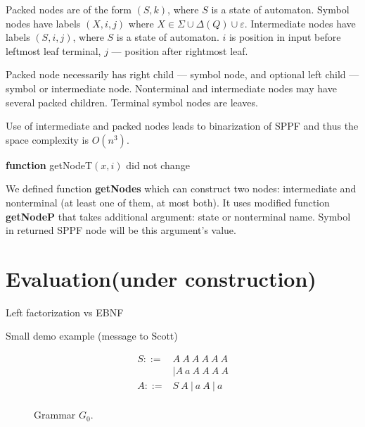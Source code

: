 \documentclass[runningheads,a4paper]{llncs}
\begin{document}
Packed nodes are of the form $(S, k)$, where $S$ is a state of automaton. 
Symbol nodes have labels $(X, i, j)$ where $X \in \Sigma \cup \Delta(Q) \cup \varepsilon$. 
Intermediate nodes have labels $ (S, i, j) $, where $S$ is a state of automaton. $i$ is position in input before leftmost leaf terminal, $j$ --- position after rightmost leaf.

Packed node necessarily has right child --- symbol node, and optional left child --- symbol or intermediate node.
Nonterminal and intermediate nodes may have several packed children. 
Terminal symbol nodes are leaves.

Use of intermediate and packed nodes leads to binarization of SPPF and thus the space complexity is $O(n^{3})$.



\textbf{function} getNodeT$(x,i)$ did not change

We defined function \textbf{getNodes} which can construct two nodes: intermediate and nonterminal (at least one of them, at most both).
It uses modified function \textbf{getNodeP} that takes additional argument: state or nonterminal name. Symbol in returned SPPF node will be this argument's value.



\section{Evaluation(under construction)}

Left factorization vs EBNF

Small demo example (message to Scott)

\begin{figure}[h]
$$
\begin{array}{crcl}
S ::=& A\ A\ A\ A\ A\ A \\
     &|A\ a\ A\ A\ A\ A \\
A ::=& S\ A\ |\ a\ A\ |\ a \\
\end{array}
$$
\caption{Grammar $G_0$.}
\label{testGrammar}
\end{figure}
\end{document}
